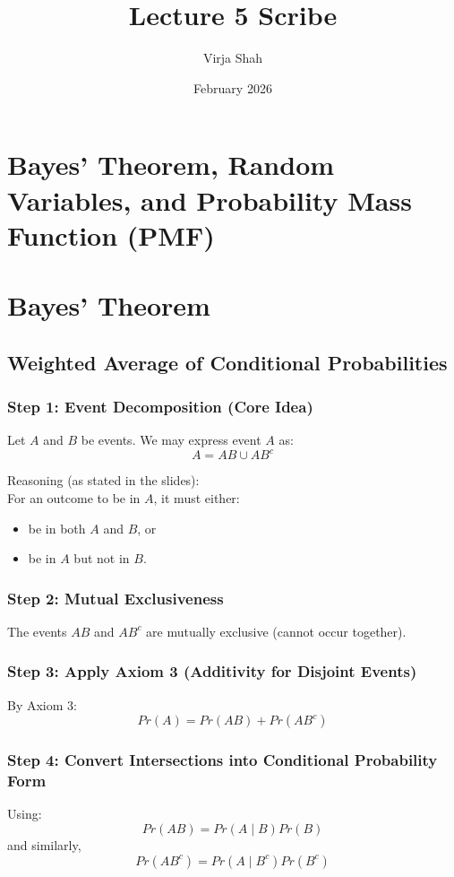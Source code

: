 \documentclass{article}
\title{Lecture 5 Scribe}
\author{Virja Shah}
\date{February 2026}
\begin{document}
\maketitle

\section*{Bayes' Theorem, Random Variables, and Probability Mass Function (PMF)}

\section{Bayes' Theorem}

\subsection{Weighted Average of Conditional Probabilities}

\subsubsection*{Step 1: Event Decomposition (Core Idea)}
Let $A$ and $B$ be events. We may express event $A$ as:
\[
A = AB \cup AB^c
\]

Reasoning (as stated in the slides):\\
For an outcome to be in $A$, it must either:
\begin{itemize}
\item be in both $A$ and $B$, or
\item be in $A$ but not in $B$.
\end{itemize}

\subsubsection*{Step 2: Mutual Exclusiveness}
The events $AB$ and $AB^c$ are mutually exclusive (cannot occur together).

\subsubsection*{Step 3: Apply Axiom 3 (Additivity for Disjoint Events)}
By Axiom 3:
\[
Pr(A)=Pr(AB)+Pr(AB^c)
\]

\subsubsection*{Step 4: Convert Intersections into Conditional Probability Form}
Using:
\[
Pr(AB)=Pr(A\mid B)Pr(B)
\]
and similarly,
\[
Pr(AB^c)=Pr(A\mid B^c)Pr(B^c)
\]
\end{document}
